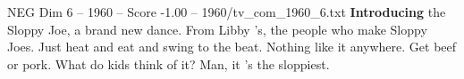 \begin{textsample}{NEG Dim 6 – 1960 – Score -1.00 – 1960/tv\_com\_1960\_6.txt}  \label{ex:f6_neg_080}
\textbf{Introducing} the Sloppy Joe, a brand new dance.
From Libby 's, the people who make Sloppy Joes.
Just heat and eat and swing to the beat.
Nothing like it anywhere.
Get beef or pork.
What do kids think of it?
Man, it 's the sloppiest.

\end{textsample}
